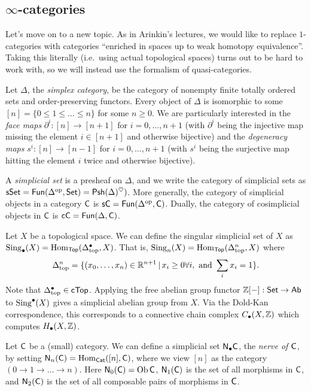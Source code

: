 \documentclass{amsart}
\begin{document}
\subsection{$\infty$-categories}

Let's move on to a new topic.
As in Arinkin's lectures, we would like to replace $1$-categories with categories ``enriched in spaces up to weak homotopy equivalence''.
Taking this literally (i.e.\ using actual topological spaces) turns out to be hard to work with, so we will instead use the formalism of quasi-categories.

Let $\Delta$, the \emph{simplex category}, be the category of nonempty finite totally ordered sets and order-preserving functors.
Every object of $\Delta$ is isomorphic to some $[n] = \{ 0 \leq 1 \leq \dots \leq n \}$ for some $n \geq 0$.
We are particularly interested in the \emph{face maps} $\partial^i: [n] \to [n+1]$ for $i = 0, \dots, n+1$ (with $\partial^i$ being the injective map missing the element $i \in [n+1]$ and otherwise bijective) and the \emph{degeneracy maps} $s^i: [n] \to [n-1]$ for $i = 0, \dots, n+1$ (with $s^i$ being the surjective map hitting the element $i$ twice and otherwise bijective).

A \emph{simplicial set} is a presheaf on $\Delta$, and we write the category of simplicial sets as $\mathsf{sSet} = \mathsf{Fun}(\Delta^{\mathrm{op}}, \mathsf{Set}) = \mathsf{Psh}(\Delta)^\heartsuit)$.
More generally, the category of simplicial objects in a category $\mathsf{C}$ is $\mathsf{s}\mathsf{C} = \mathsf{Fun}(\Delta^{\mathrm{op}}, \mathsf{C})$.
Dually, the category of cosimplicial objects in $\mathsf{C}$ is $\mathsf{c}\mathsf{C} = \mathsf{Fun}(\Delta, \mathsf{C})$.

\begin{ex}
	Let $X$ be a topological space.
	We can define the singular simplicial set of $X$ as $\operatorname{Sing}_\bullet(X) = \operatorname{Hom}_{\mathsf{Top}}(\Delta^\bullet_{\mathrm{top}}, X)$.
	That is, $\operatorname{Sing}_n(X) = \operatorname{Hom}_{\mathsf{Top}}(\Delta^n_{\mathrm{top}}, X)$ where 
	\[
		\Delta^n_{\mathrm{top}} = \{ (x_0, \dots, x_n) \in \mathbb{R}^{n+1} \, | \, x_i \geq 0 \forall i, \textrm{ and } \sum_{i} x_i = 1\}.
	\]
	Note that $\Delta^\bullet_{\mathrm{top}} \in \mathsf{c}\mathsf{Top}$.
	Applying the free abelian group functor $\mathbb{Z}[-]: \mathsf{Set} \to \mathsf{Ab}$ to $\operatorname{Sing}^\bullet(X)$ gives a simplicial abelian group from $X$.
	Via the Dold-Kan correspondence, this corresponds to a connective chain complex $C_\bullet(X, \mathbb{Z})$ which computes $H_\bullet(X, \mathbb{Z})$.
\end{ex}

\begin{ex}
	Let $\mathsf{C}$ be a (small) category.
	We can define a simplicial set $\mathsf{N}_\bullet \mathsf{C}$, the \emph{nerve of $\mathsf{C}$}, by setting $\mathsf{N}_n(\mathsf{C}) = \operatorname{Hom}_{\mathsf{Cat}}([n], \mathsf{C})$, where we view $[n]$ as the category $(0 \to 1 \to \dots \to n)$.
	Here $\mathsf{N}_0(\mathsf{C}) = \operatorname{Ob} \mathsf{C}$, $\mathsf{N}_1(\mathsf{C})$ is the set of all morphisms in $\mathsf{C}$, and $\mathsf{N}_2(\mathsf{C})$ is the set of all composable pairs of morphisms in $\mathsf{C}$.
\end{ex}
\end{document}
